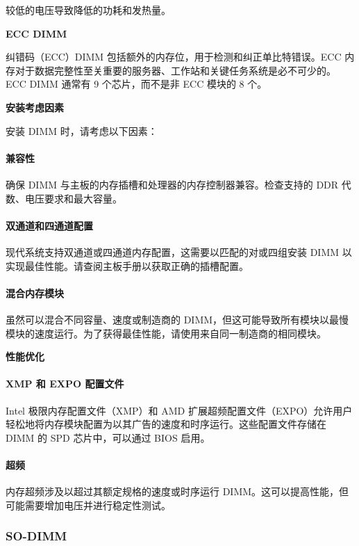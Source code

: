 \documentclass{article}
\begin{document}
较低的电压导致降低的功耗和发热量。

\textbf{ECC DIMM}

纠错码（ECC）DIMM 包括额外的内存位，用于检测和纠正单比特错误。ECC 内存对于数据完整性至关重要的服务器、工作站和关键任务系统是必不可少的。ECC DIMM 通常有 9 个芯片，而不是非 ECC 模块的 8 个。

\textbf{安装考虑因素}

安装 DIMM 时，请考虑以下因素：

\paragraph{兼容性}

确保 DIMM 与主板的内存插槽和处理器的内存控制器兼容。检查支持的 DDR 代数、电压要求和最大容量。

\paragraph{双通道和四通道配置}

现代系统支持双通道或四通道内存配置，这需要以匹配的对或四组安装 DIMM 以实现最佳性能。请查阅主板手册以获取正确的插槽配置。

\paragraph{混合内存模块}

虽然可以混合不同容量、速度或制造商的 DIMM，但这可能导致所有模块以最慢模块的速度运行。为了获得最佳性能，请使用来自同一制造商的相同模块。

\textbf{性能优化}

\paragraph{XMP 和 EXPO 配置文件}

Intel 极限内存配置文件（XMP）和 AMD 扩展超频配置文件（EXPO）允许用户轻松地将内存模块配置为以其广告的速度和时序运行。这些配置文件存储在 DIMM 的 SPD 芯片中，可以通过 BIOS 启用。

\paragraph{超频}

内存超频涉及以超过其额定规格的速度或时序运行 DIMM。这可以提高性能，但可能需要增加电压并进行稳定性测试。

\subsubsection{SO-DIMM}
\end{document}
